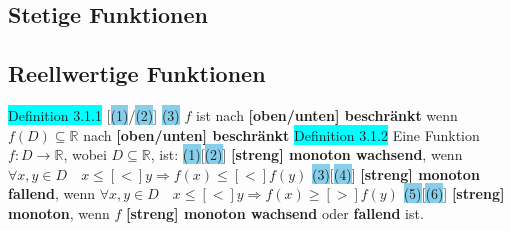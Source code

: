 \documentclass[landscape, 10pt]{article}
\newcommand{\R}{\mathbb{R}}
\begin{document}
\begin{multicols}{3}
\section{Stetige Funktionen}
\subsection{Reellwertige Funktionen}
\colorbox{cyan}{Definition 3.1.1} [\colorbox{SkyBlue}{(1)}/\colorbox{SkyBlue}{(2)}]
                \colorbox{SkyBlue}{(3)} $f$ ist nach \textbf{[oben/unten] beschränkt} wenn 
                \textcolor{NavyBlue}{$f(D)\subseteq\R$} 
                nach \textbf{[oben/unten] beschränkt} %
\colorbox{cyan}{Definition 3.1.2} Eine Funktion $f:D\longrightarrow\R$, wobei 
                $D\subseteq\R$, ist:
         \colorbox{SkyBlue}{(1)}[\colorbox{SkyBlue}{(2)}] \textbf{[streng] monoton 
                wachsend}, wenn \textcolor{NavyBlue}{
                $\forall x,y\in D\quad x\leqslant [<]y\Rightarrow f(x)\leqslant [<]f(y)$} 
         \colorbox{SkyBlue}{(3)}[\colorbox{SkyBlue}{(4)}] \textbf{[streng] monoton 
                fallend}, wenn \textcolor{NavyBlue}{
                $\forall x,y\in D\quad x\leqslant [<]y\Rightarrow f(x)\geqslant [>]f(y)$} 
         \colorbox{SkyBlue}{(5)}[\colorbox{SkyBlue}{(6)}] \textbf{[streng] monoton}, 
                wenn \textcolor{NavyBlue}{$f$} 
                \textbf{[streng] monoton wachsend} oder \textbf{fallend} ist.

\end{multicols}
\end{document}
